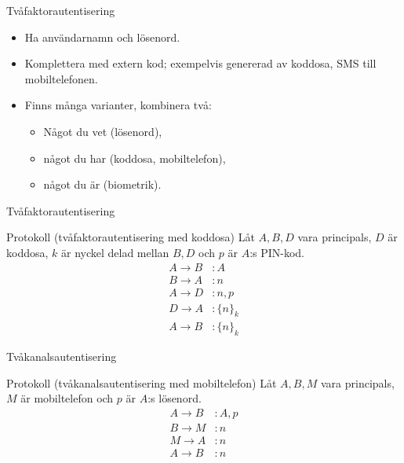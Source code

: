 \documentclass{beamer}
\theoremstyle{definition}
\theoremstyle{remark}
\newcommand{\encrypt}[2]{\{#1\}_{#2}}
\begin{document}
\begin{frame}{\insertsubsectionhead}{Tvåfaktorautentisering}
  \begin{itemize}
    \item Ha användarnamn och lösenord.
    \item Komplettera med extern kod; exempelvis genererad av koddosa, SMS till 
      mobiltelefonen.
    \item Finns många varianter, kombinera två:
      \begin{itemize}
        \item Något du vet (lösenord),
        \item något du har (koddosa, mobiltelefon),
        \item något du är (biometrik).
      \end{itemize}
  \end{itemize}
\end{frame}

\begin{frame}{\insertsubsectionhead}{Tvåfaktorautentisering}
  \begin{block}{Protokoll (tvåfaktorautentisering med koddosa)}
    Låt \(A, B, D\) vara principals, \(D\) är koddosa, \(k\) är nyckel delad 
    mellan \(B, D\) och \(p\) är \(A\):s PIN-kod.
    \begin{align*}
      A\to B &\colon A \\
      B\to A &\colon n \\
      A\to D &\colon n, p \\
      D\to A &\colon \encrypt{n}{k} \\
      A\to B &\colon \encrypt{n}{k}
    \end{align*}
  \end{block}
\end{frame}

\begin{frame}{\insertsubsectionhead}{Tvåkanalsautentisering}
  \begin{block}{Protokoll (tvåkanalsautentisering med mobiltelefon)}
    Låt \(A, B, M\) vara principals, \(M\) är mobiltelefon och \(p\) är \(A\):s 
    lösenord.
    \begin{align*}
      A\to B &\colon A, p \\
      B\to M &\colon n \\
      M\to A &\colon n \\
      A\to B &\colon n
    \end{align*}
  \end{block}
\end{frame}
\end{document}
